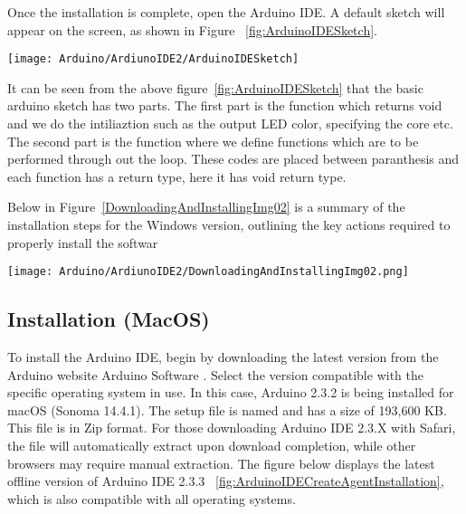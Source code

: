 Once the installation is complete, open the Arduino IDE. A default sketch will appear on the screen, as shown in Figure ~\ref{fig:ArduinoIDESketch}.

\begin{center}\centering
	\texttt{[image: Arduino/ArdiunoIDE2/ArduinoIDESketch]}
	\label{fig:ArduinoIDESketch}		
\end{center}


It can be seen from the above figure~\ref{fig:ArduinoIDESketch} that the basic arduino sketch has two parts. The first part is the function  which returns void and we do the intiliaztion such as the output LED color, specifying the core etc. The second part is the function  where we define functions which are to be performed through out the loop. These codes are placed between paranthesis \PYTHON{$\{ \}$} and each function has a return type, here it has void return type.


Below in Figure~\ref{DownloadingAndInstallingImg02} is a summary of the installation steps for the Windows version, outlining the key actions required to properly install the softwar

\begin{center}\centering
   
        \texttt{[image: Arduino/ArdiunoIDE2/DownloadingAndInstallingImg02.png]}
        \label{DownloadingAndInstallingImg02}
       
 \end{center}


\subsection{Installation (MacOS)}

To install the Arduino IDE, begin by downloading the latest version from the Arduino website Arduino Software . Select the version compatible with the specific operating system in use. In this case, Arduino 2.3.2 is being installed for macOS (Sonoma 14.4.1). The setup file is named  and has a size of 193,600 KB. This file is in Zip format. For those downloading Arduino IDE 2.3.X with Safari, the file will automatically extract upon download completion, while other browsers may require manual extraction. The figure below displays the latest offline version of Arduino IDE 2.3.3 ~\ref{fig:ArduinoIDECreateAgentInstallation}, which is also compatible with all operating systems.




